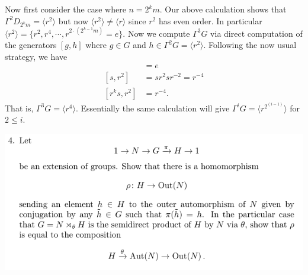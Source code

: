 \documentclass[12pt,letterpaper,boxed]{hmcpset}
\newcommand{\anglee}[1]{\langle #1 \rangle}
\begin{document}
\begin{solution}
Now first consider the case where $n = 2^km$. Our above calculation
shows that $\Gamma^{2}D_{2^km} = \anglee{r^2}$ but now $\anglee{r^2}
\neq \anglee r$ since $r^2$ has even order. In particular
$\anglee{r^2} = \{r^2, r^4, \cdots, r^{2\cdot(2^{k-1}m)} = e\}$. 
Now we compute $\Gamma^3 G$ via direct computation of the generators
$[g,h]$ where $g \in G$ and $h \in \Gamma^2G = \anglee{r^2}$.
Following the now usual strategy, we have 
\begin{align*}
	[r^k, r^2] &= e \\
	[s, r^2] &= sr^2 s r^{-2} = r^{-4} \\
	[r^ks, r^2] &= r^{-4}.
\end{align*}
That is, $\Gamma^3 G = \anglee{r^4}$. Essentially the same calculation
will give $\Gamma^i G = \anglee{r^{2^{(i-1)}}}$ for $2 \leq i$.

\end{solution}

\newpage


\begin{problem}[3]
	\hfill
\end{problem}
\begin{solution}
\end{solution}

\newpage


\begin{problem}
	\includegraphics[scale=0.8]{4.png}
	\hfill
\end{problem}
\end{document}
